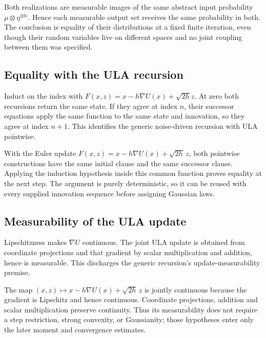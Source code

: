 \documentclass[11pt,a4paper]{report}
\begin{document}
Both realizations are measurable images of the same abstract input probability \(\mu\otimes\eta^{\otimes\mathbb N}\). Hence each measurable output set receives the same probability in both. The conclusion is equality of their distributions at a fixed finite iteration, even though their random variables live on different spaces and no joint coupling between them was specified.

\subsection{\texorpdfstring{Equality with the ULA recursion}{Equality with the ULA recursion}}
\label{report-step-UnadjustedLangevin-ChainLaw-lean-10}


Induct on the index with \(F(x,z)=x-h\nabla U(x)+\sqrt{2h}z\). At zero both recursions return the same state. If they agree at index \(n\), their successor equations apply the same function to the same state and innovation, so they agree at index \(n+1\). This identifies the generic noise-driven recursion with ULA pointwise.



With the Euler update \(F(x,z)=x-h\nabla U(x)+\sqrt{2h}\,z\), both pointwise constructions have the same initial clause and the same successor clause. Applying the induction hypothesis inside this common function proves equality at the next step. The argument is purely deterministic, so it can be reused with every supplied innovation sequence before assigning Gaussian laws.

\subsection{\texorpdfstring{Measurability of the ULA update}{Measurability of the ULA update}}
\label{report-step-UnadjustedLangevin-ChainLaw-lean-11}


Lipschitzness makes \(\nabla U\) continuous. The joint ULA update is obtained from coordinate projections and that gradient by scalar multiplication and addition, hence is measurable. This discharges the generic recursion's update-measurability premise.



The map \((x,z)\mapsto x-h\nabla U(x)+\sqrt{2h}\,z\) is jointly continuous because the gradient is Lipschitz and hence continuous. Coordinate projections, addition and scalar multiplication preserve continuity. Thus its measurability does not require a step restriction, strong convexity, or Gaussianity; those hypotheses enter only the later moment and convergence estimates.
\end{document}
